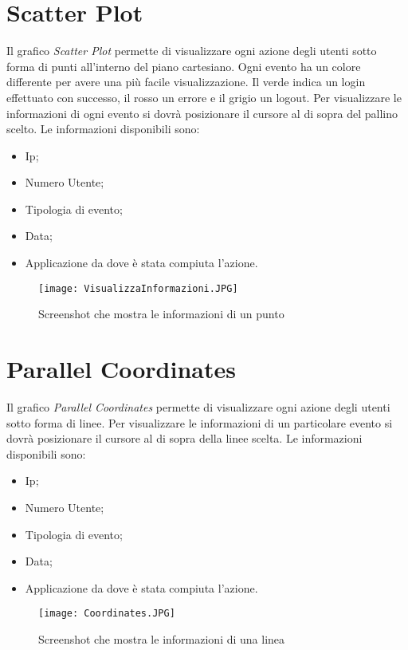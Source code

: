 \section{Scatter Plot}
Il grafico \textit{Scatter Plot} permette di visualizzare ogni azione degli utenti sotto forma di punti all'interno del piano cartesiano.
Ogni evento ha un colore differente per avere una più facile visualizzazione.
Il verde indica un login effettuato con successo, il rosso un errore e il grigio un logout.
Per visualizzare le informazioni di ogni evento si dovrà posizionare il cursore al di sopra del pallino scelto. Le informazioni disponibili sono:
\begin{itemize}
  \item Ip;
  \item Numero Utente;
  \item Tipologia di evento;
  \item Data;
  \item Applicazione da dove è stata compiuta l'azione.
\end{itemize}

\begin{figure}[H]
    \texttt{[image: VisualizzaInformazioni.JPG]}
    \caption{Screenshot che mostra le informazioni di un punto}
\end{figure}

\section{Parallel Coordinates}
Il grafico \textit{Parallel Coordinates} permette di visualizzare ogni azione degli utenti sotto forma di linee.
Per visualizzare le informazioni di un particolare evento si dovrà posizionare il cursore al di sopra della linee scelta. Le informazioni disponibili sono:
\begin{itemize}
  \item Ip;
  \item Numero Utente;
  \item Tipologia di evento;
  \item Data;
  \item Applicazione da dove è stata compiuta l'azione.
\end{itemize}

\begin{figure}[H]
    \texttt{[image: Coordinates.JPG]}
    \caption{Screenshot che mostra le informazioni di una linea}
\end{figure}

